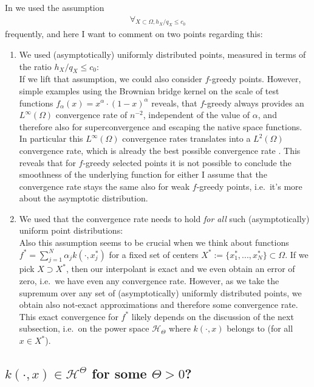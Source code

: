 \documentclass[a4paper, 10pt]{article}
\newcommand{\HT}{\mathcal{H}_{\Theta}}
\begin{document}
In  we used the assumption
\begin{align*}
\forall_{X \subset \Omega, h_X/q_X \leq c_0}
\end{align*}
frequently, and here I want to comment on two points regarding this:
\begin{enumerate}
\item We used (asymptotically) uniformly distributed points, measured in terms of the ratio $h_X/q_X \leq c_0$: \\
If we lift that assumption, we could also consider $f$-greedy points.
However, simple examples using the Brownian bridge kernel on the scale of test functions $f_\alpha(x) = x^\alpha \cdot (1-x)^\alpha$ reveals,
that $f$-greedy always provides an $L^\infty(\Omega)$ convergence rate of $n^{-2}$, independent of the value of $\alpha$, 
and therefore also for superconvergence and escaping the native space functions.
In particular this $L^\infty(\Omega)$ convergence rates translates into a $L^2(\Omega)$ convergence rate, which is already the best possible convergence rate \cite[Section 6.2]{wenzel2023analysis}.
This reveals that for $f$-greedy selected points it is not possible to conclude the smoothness of the underlying function for either 
I assume that the convergence rate stays the same also for weak $f$-greedy points, i.e.\ it's more about the asymptotic distribution.
\item We used that the convergence rate needs to hold \textit{for all} such (asymptotically) uniform point distributions: \\
Also this assumption seems to be crucial when we think about functions $f^* = \sum_{j=1}^N \alpha_j k(\cdot, x_j^*)$ for a fixed set of centers $X^* := \{ x_1^*, ..., x_N^*\} \subset \Omega$.
If we pick $X \supset X^*$, then our interpolant is exact and we even obtain an error of zero, i.e.\ we have even any convergence rate.
However, as we take the supremum over any set of (asymptotically) uniformly distributed points, we obtain also not-exact approximations and therefore some convergence rate. \\
This exact convergence for $f^*$ likely depends on the discussion of the next subsection, i.e.\ on the power space $\HT$ where $k(\cdot, x)$ belongs to (for all $x \in X^*$).
\end{enumerate}


\subsection{$k(\cdot, x) \in \mathcal{H}^\Theta$ for some $\Theta > 0$?}
\label{subsec:kernel_transl_smoother}
\end{document}
